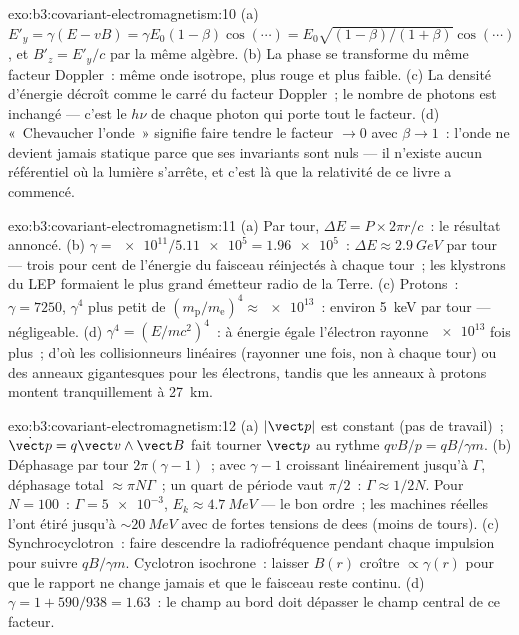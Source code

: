 \begin{solution}{exo:b3:covariant-electromagnetism:10}
(a) $E'_y = \gamma(E - vB) = \gamma E_0(1 - \beta)\cos(\cdots) =
E_0\sqrt{(1-\beta)/(1+\beta)}\cos(\cdots)$, et $B'_z = E'_y/c$ par la
même algèbre. (b) La phase se transforme du même facteur Doppler~:
même onde isotrope, plus rouge et plus faible. (c) La densité
d'énergie décroît comme le carré du facteur Doppler~; le nombre de
photons est inchangé --- c'est le $h\nu$ de chaque photon qui porte
tout le facteur. (d) «~Chevaucher l'onde~» signifie faire tendre le
facteur $\to 0$ avec $\beta \to 1$~: l'onde ne devient jamais statique
parce que ses invariants sont nuls --- il n'existe aucun référentiel où
la lumière s'arrête, et c'est là que la relativité de ce livre a
commencé.
\end{solution}

\begin{solution}{exo:b3:covariant-electromagnetism:11}
(a) Par tour, $\Delta E = P \times 2\pi r/c$~: le résultat annoncé. (b)
$\gamma = \num{e11}/\num{5.11e5} = \num{1.96e5}$~: $\Delta E \approx
\qty{2.9}{GeV}$ par tour --- trois pour cent de l'énergie du faisceau
réinjectés à chaque tour~; les klystrons du LEP formaient le plus grand
émetteur radio de la Terre. (c) Protons~: $\gamma = 7250$, $\gamma^4$
plus petit de $(m_{\text{p}}/m_{\text{e}})^4 \approx \num{e13}$~:
environ \qty{5}{keV} par tour --- négligeable. (d) $\gamma^4 = (E/mc^2)^4$~:
à énergie égale l'électron rayonne $\num{e13}$ fois plus~; d'où les
collisionneurs linéaires (rayonner une fois, non à chaque tour) ou des
anneaux gigantesques pour les électrons, tandis que les anneaux à
protons montent tranquillement à \qty{27}{km}.
\end{solution}

\begin{solution}{exo:b3:covariant-electromagnetism:12}
(a) $|\vect p|$ est constant (pas de travail)~; $\dot{\vect p} = q\vect
v\wedge\vect B$ fait tourner $\vect p$ au rythme $qvB/p = qB/\gamma m$. (b)
Déphasage par tour $2\pi(\gamma - 1)$~; avec $\gamma - 1$ croissant
linéairement jusqu'à $\Gamma$, déphasage total $\approx \pi N\Gamma$~;
un quart de période vaut $\pi/2$~: $\Gamma \approx 1/2N$. Pour $N = 100$~: $\Gamma =
\num{5e-3}$, $E_k \approx \qty{4.7}{MeV}$ --- le bon ordre~; les
machines réelles l'ont étiré jusqu'à $\sim\qty{20}{MeV}$ avec de fortes
tensions de dees (moins de tours). (c) Synchrocyclotron~: faire
descendre la radiofréquence pendant chaque impulsion pour suivre
$qB/\gamma m$. Cyclotron isochrone~: laisser $B(r)$ croître
$\propto\gamma(r)$ pour que le rapport ne change jamais et que le
faisceau reste continu. (d) $\gamma = 1 + 590/938 = 1.63$~: le champ au
bord doit dépasser le champ central de ce facteur.
\end{solution}

